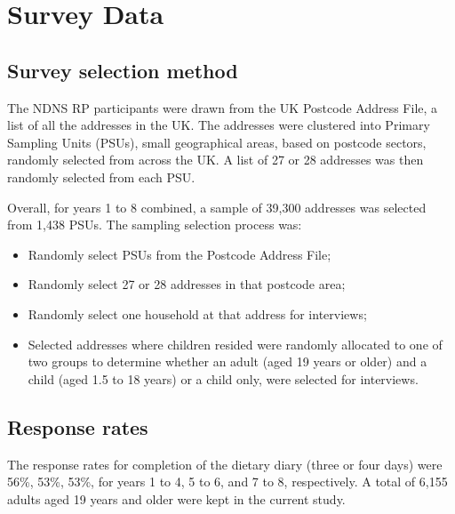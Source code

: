 
\section{Survey Data}\vspace{-0.3cm}

\subsection{Survey selection method}\vspace{-0.3cm}

The NDNS RP participants were drawn from the UK Postcode Address File, a list of all the addresses in the UK. The addresses were clustered into Primary Sampling Units (PSUs), small geographical areas, based on postcode sectors, randomly selected from across the UK. A list of 27 or 28 addresses was then randomly selected from each PSU.

Overall, for years 1 to 8 combined, a sample of 39,300 addresses was selected from 1,438 PSUs. The sampling selection process was: 

\begin{itemize}
	\item Randomly select PSUs from the Postcode Address File; 
	\item Randomly select 27 or 28 addresses in that postcode area; 
	\item Randomly select one household at that address for interviews; 
	\item Selected addresses where children resided were randomly allocated to one of two groups to determine whether an adult (aged 19 years or older) and a child (aged 1.5 to 18 years) or a child only, were selected for interviews.
\end{itemize}
\vspace{-0.6cm}
\subsection{Response rates}\vspace{-0.3cm}

The response rates for completion of the dietary diary (three or four days) were 56\%, 53\%, 53\%, for years 1 to 4, 5 to 6, and 7 to 8, respectively. A total of 6,155 adults aged 19 years and older were kept in the current study. 
\vspace{-0.6cm}


